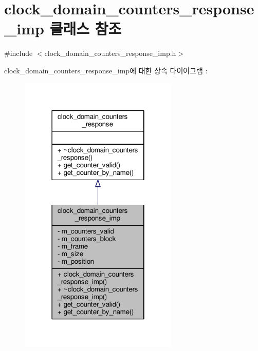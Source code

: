 \hypertarget{classavdecc__lib_1_1clock__domain__counters__response__imp}{}\section{clock\+\_\+domain\+\_\+counters\+\_\+response\+\_\+imp 클래스 참조}
\label{classavdecc__lib_1_1clock__domain__counters__response__imp}


{\ttfamily \#include $<$clock\+\_\+domain\+\_\+counters\+\_\+response\+\_\+imp.\+h$>$}



clock\+\_\+domain\+\_\+counters\+\_\+response\+\_\+imp에 대한 상속 다이어그램 \+: 
\nopagebreak
\begin{figure}[H]
\begin{center}
\leavevmode
\includegraphics[width=214pt]{classavdecc__lib_1_1clock__domain__counters__response__imp__inherit__graph}
\end{center}
\end{figure}


